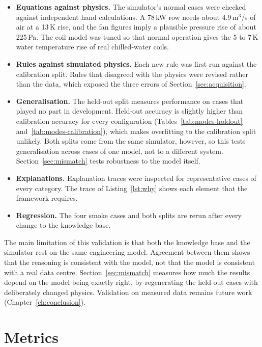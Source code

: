 \begin{itemize}
  \item \textbf{Equations against physics.} The simulator's normal cases were checked against independent hand calculations. A 78\,kW row needs about 4.9\,m$^3$/s of air at a 13\,K rise, and the fan figures imply a plausible pressure rise of about 225\,Pa. The coil model was tuned so that normal operation gives the 5 to 7\,K water temperature rise of real chilled-water coils.
  \item \textbf{Rules against simulated physics.} Each new rule was first run against the calibration split. Rules that disagreed with the physics were revised rather than the data, which exposed the three errors of Section~\ref{sec:acquisition}.
  \item \textbf{Generalisation.} The held-out split measures performance on cases that played no part in development. Held-out accuracy is slightly higher than calibration accuracy for every configuration (Tables~\ref{tab:modes-holdout} and~\ref{tab:modes-calibration}), which makes overfitting to the calibration split unlikely. Both splits come from the same simulator, however, so this tests generalisation across cases of one model, not to a different system. Section~\ref{sec:mismatch} tests robustness to the model itself.
  \item \textbf{Explanations.} Explanation traces were inspected for representative cases of every category. The trace of Listing~\ref{lst:why} shows each element that the framework requires.
  \item \textbf{Regression.} The four smoke cases and both splits are rerun after every change to the knowledge base.
\end{itemize}

The main limitation of this validation is that both the knowledge base and the simulator rest on the same engineering model. Agreement between them shows that the reasoning is consistent with the model, not that the model is consistent with a real data centre. Section~\ref{sec:mismatch} measures how much the results depend on the model being exactly right, by regenerating the held-out cases with deliberately changed physics. Validation on measured data remains future work (Chapter~\ref{ch:conclusion}).

\section{Metrics}
\label{sec:metrics}

